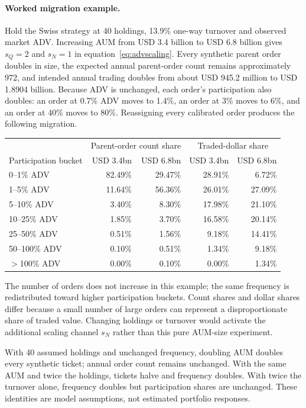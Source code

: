 \documentclass[11pt,a4paper]{article}
\numberwithin{equation}{section}
\begin{document}
\paragraph{Worked migration example.}
Hold the Swiss strategy at 40 holdings, 13.9\% one-way turnover and observed market ADV. Increasing
AUM from USD 3.4 billion to USD 6.8 billion gives $s_Q=2$ and $s_N=1$ in
equation~\eqref{eq:advscaling}. Every synthetic parent order doubles in size, the expected annual
parent-order count remains approximately 972, and intended annual trading doubles from about
USD 945.2 million to USD 1.8904 billion. Because ADV is unchanged, each order's participation also
doubles: an order at 0.7\% ADV moves to 1.4\%, an order at 3\% moves to 6\%, and an order at 40\%
moves to 80\%. Reassigning every calibrated order produces the following migration.
\begin{center}
\begin{tabular}{lrrrr}
\toprule
& \multicolumn{2}{c}{Parent-order count share} & \multicolumn{2}{c}{Traded-dollar share}\\
Participation bucket & USD 3.4bn & USD 6.8bn & USD 3.4bn & USD 6.8bn\\
\midrule
0--1\% ADV    & 82.49\% & 29.47\% & 28.91\% &  6.72\%\\
1--5\% ADV    & 11.64\% & 56.36\% & 26.01\% & 27.09\%\\
5--10\% ADV   &  3.40\% &  8.30\% & 17.98\% & 21.10\%\\
10--25\% ADV  &  1.85\% &  3.70\% & 16.58\% & 20.14\%\\
25--50\% ADV  &  0.51\% &  1.56\% &  9.18\% & 14.41\%\\
50--100\% ADV &  0.10\% &  0.51\% &  1.34\% &  9.18\%\\
$>$100\% ADV  &  0.00\% &  0.10\% &  0.00\% &  1.34\%\\
\bottomrule
\end{tabular}
\end{center}
The number of orders does not increase in this example; the same frequency is redistributed toward
higher participation buckets. Count shares and dollar shares differ because a small number of large
orders can represent a disproportionate share of traded value. Changing holdings or turnover would
activate the additional scaling channel $s_N$ rather than this pure AUM-size experiment.

With 40 assumed holdings and unchanged frequency, doubling AUM doubles every synthetic ticket;
annual order count remains unchanged. With the same AUM and twice the holdings, tickets halve
and frequency doubles. With twice the turnover alone, frequency doubles but participation
shares are unchanged. These identities are model assumptions, not estimated portfolio responses.
\end{document}
